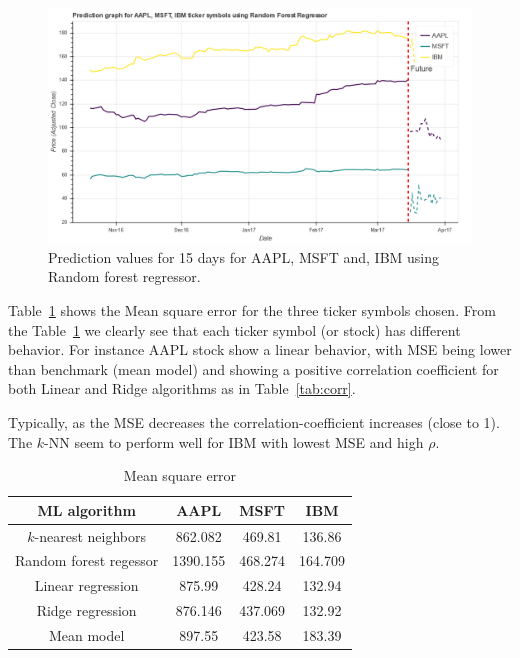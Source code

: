 \documentclass[12pt]{article}
\begin{document}
\begin{itemize}
\begin{figure}[!htbp]
\begin{center}
\includegraphics[height=0.4\textheight,width=\textwidth]{rfr_model.png}
\caption{Prediction values for 15 days for AAPL, MSFT and, IBM using Random forest regressor.}
\label{fig:rfr_mdl}
\end{center}
\end{figure}
\end{itemize}

Table~\ref{tab:mse} shows the Mean square error for the three ticker symbols chosen. From the Table~\ref{tab:mse} we clearly see that each ticker symbol (or stock) has different behavior. For instance AAPL stock show a linear behavior, with MSE being lower than benchmark (mean model) and showing a positive correlation coefficient for both Linear and Ridge algorithms as in Table~\ref{tab:corr}. 

Typically, as the MSE decreases the correlation-coefficient increases (close to 1). The $k$-NN seem to perform well for IBM with lowest MSE and high $\rho$.



\begin{table}
\begin{center}
\begin{tabular} {|c|c|c|c|}
\hline \hline
\textbf{ML algorithm} & \textbf{AAPL} & \textbf{MSFT} & \textbf{IBM} \\ \hline
$k$-nearest neighbors & 862.082 & 469.81 & 136.86 \\ \hline
Random forest regessor & 1390.155 & 468.274 & 164.709 \\ \hline
Linear regression &875.99 & 428.24 & 132.94  \\ \hline
Ridge regression & 876.146 & 437.069 & 132.92  \\ \hline
Mean model & 897.55 & 423.58 & 183.39  \\ \hline
\hline
\end{tabular}
\end{center}
\caption{Mean square error}
\label{tab:mse}
\end{table}
\end{document}
